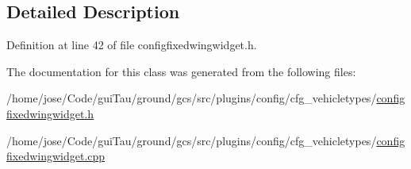 \subsection{Detailed Description}


Definition at line 42 of file configfixedwingwidget.\-h.



The documentation for this class was generated from the following files\-:\begin{DoxyCompactItemize}
\item 
/home/jose/\-Code/gui\-Tau/ground/gcs/src/plugins/config/cfg\-\_\-vehicletypes/\hyperlink{configfixedwingwidget_8h}{configfixedwingwidget.\-h}\item 
/home/jose/\-Code/gui\-Tau/ground/gcs/src/plugins/config/cfg\-\_\-vehicletypes/\hyperlink{configfixedwingwidget_8cpp}{configfixedwingwidget.\-cpp}\end{DoxyCompactItemize}
